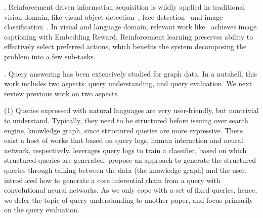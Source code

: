 . Reinforcement driven information acquisition is wildly applied in traditional vision domain, like visual object detection~\cite{DBLP:conf/cvpr/MathePS16}, face detection~\cite{DBLP:conf/cvpr/GoodrichA12} and image classification~\cite{DBLP:conf/nips/MnihHGK14}. In visual and language domain, relevant work like~\cite{DBLP:conf/cvpr/RenWZLL17} achieves image captioning with Embedding Reward. Reinforcement learning preserves ability to effectively select preferred actions, which benefits the system decomposing the problem into a few sub-tasks.




. Query answering has been extensively studied for graph data. In a nutshell, this work includes two aspects: query understanding, and query evaluation. We next review previous work on two aspects. 

\noindent (1) Queries expressed with natural languages are very user-friendly, but nontrivial to understand. Typically, they need to be structured before issuing over \eg search engine, knowledge graph, since structured queries are more expressive. There exist a host of works that based on query logs, human interaction and neural network, respectively. \cite{PoundHIW12} leverages query logs to train a classifier, based on which structured queries are generated.  \cite{ZhengC0YZ17} propose an approach to generate the structured queries through talking between the data (\ie the knowledge graph) and the user. \cite{YihCHG15} introduced how to generate a core inferential chain from a query with convolutional neural networks. As we only cope with a set of fixed queries, hence, we defer
the topic of query understanding to another paper, and focus primarily on the query evaluation. 

